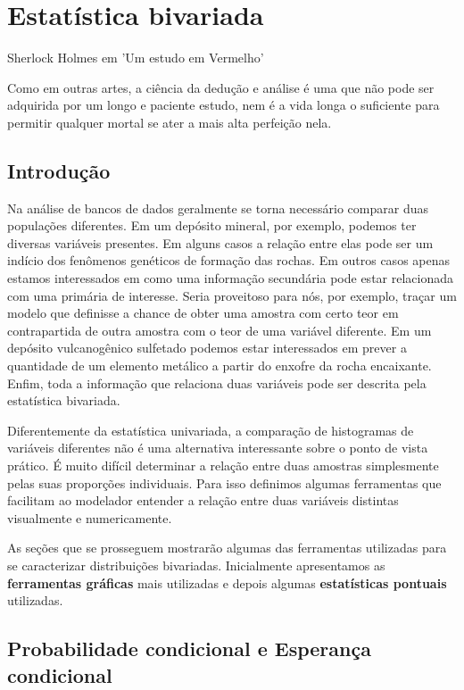 \chapter{Estatística bivariada}

\begin{myquoting}{Sherlock Holmes em 'Um estudo em Vermelho'}
	
	Como em outras artes,  a ciência da dedução e análise é uma que não pode ser adquirida por um longo e paciente estudo, nem é a vida longa o suficiente para permitir qualquer mortal se ater a mais alta perfeição nela.  
\end{myquoting}

\section{Introdução}

Na análise de bancos de dados geralmente se torna necessário comparar duas populações diferentes. Em um depósito mineral, por exemplo, podemos ter diversas variáveis presentes. Em alguns casos a relação entre elas pode ser um indício dos fenômenos genéticos de formação das rochas. Em outros casos apenas estamos interessados em como uma informação secundária pode estar relacionada com uma primária de interesse. Seria proveitoso para nós, por exemplo, traçar um modelo que definisse a chance de obter uma amostra com certo teor em contrapartida de outra amostra com o teor de uma variável diferente. Em um depósito vulcanogênico sulfetado podemos estar interessados em prever a quantidade de um elemento metálico a partir do enxofre da rocha encaixante. Enfim, toda a informação que relaciona duas variáveis pode ser descrita pela estatística bivariada.  

Diferentemente da estatística univariada, a comparação de histogramas de variáveis diferentes não é uma alternativa interessante sobre o ponto de vista prático. É muito difícil determinar a relação entre duas amostras simplesmente pelas suas proporções individuais. Para isso definimos algumas ferramentas que facilitam ao modelador entender a relação entre duas variáveis distintas visualmente e numericamente. 

As seções que se prosseguem mostrarão algumas das ferramentas utilizadas para se caracterizar distribuições bivariadas. Inicialmente apresentamos as \textbf{ferramentas gráficas} mais utilizadas e depois algumas \textbf{estatísticas pontuais} utilizadas. 

\section{Probabilidade condicional e Esperança condicional} 

